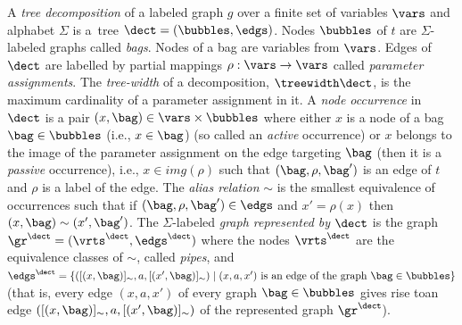 {A \emph{tree decomposition} of a labeled graph $g$ over a finite set of variables $\vars$ and alphabet $\Sigma$
is a~tree $\dect=(\bubbles,\edgs)$.
Nodes $\bubbles$ of $t$ are $\Sigma$-labeled graphs called \emph{bags}.
Nodes of a bag are variables from $\vars$. %
Edges of $\dect$ are labelled by partial mappings $\rho:\vars\rightarrow\vars$ called \emph{parameter assignments}.
The \emph{tree-width} of a decomposition, $\treewidth \dect$, is the maximum cardinality of a parameter assignment in it.  %
%
A \emph{node occurrence} in $\dect$ is a pair $(x,\bag) \in \vars \times \bubbles$ where either $x$ is a node of a bag $\bag\in \bubbles$ (i.e., $x\in \bag$) (so called an \emph{active} occurrence) or $x$ belongs to the image of the parameter assignment on the edge targeting $\bag$ (then it is a \emph{passive} occurrence), i.e., $x\in img(\rho)$ such that $(\bag,\rho,\bag')$ is an edge of $t$ and $\rho$ is a label of the edge.
%
%
The \emph{alias relation} $\sim$ is the smallest equivalence of occurrences such that if $(\bag,\rho,\bag')\in \edgs$ and $x' = \rho(x)$ then $(x,\bag)\sim(x',\bag')$.
%
%
The $\Sigma$-labeled \emph{graph represented by $\dect$} is the graph
%
$\gr^\dect = (\vrts^\dect,\edgs^\dect)$ 
where the nodes $\vrts^\dect$ are the equivalence classes of $\sim$, called \emph{pipes},
and $\edgs^\dect = \{([(x,\bag)]_{\sim},a,[(x',\bag)]_{\sim}) \mid (x,a,x') \text{ is an edge of the graph } \bag\in \bubbles\}$ (that is, every edge $(x,a,x')$ of every graph $\bag\in \bubbles$ gives rise to\linebreak an edge $([(x,\bag)]_{\sim},a,[(x',\bag)]_{\sim})$ of the represented graph $\gr^\dect$).
%

}
